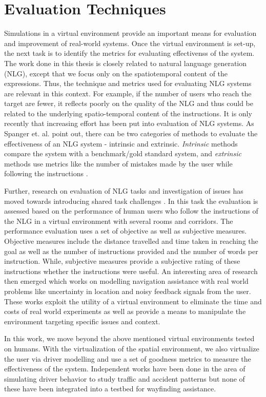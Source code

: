 \documentclass{iitkthesis}
\begin{document}
 \section{Evaluation Techniques}
Simulations in a virtual environment provide an important means for 
evaluation and improvement of real-world systems. Once the virtual 
environment is set-up, the next task is to identify the metrics for 
evaluating effectivenss of the system. The work done in this thesis is 
closely related to natural language generation (NLG), except that we focus 
only on the spatiotemporal content of the expressions. Thus, the 
technique and metrics used for evaluating NLG systems are relevant in 
this context. For example, if the number of users who reach the target 
are fewer, it reflects poorly on the quality of the NLG and thus 
could be related to the underlying spatio-temporal content of the 
instructions. It is only recently that increasing effort has 
been put into evaluation of NLG systems. As Spanger et. al. \cite{spanger} 
point out, there can be two categories of methods to evaluate the 
effectiveness of an NLG system - intrinsic and extrinsic. \textit{
Intrinsic} methods compare the system with a benchmark/gold standard 
system, and \textit{extrinsic} methods use metrics like the number of 
mistakes made by the user while following the instructions \cite{young}. 

Further, research on evaluation of NLG tasks and investigation of issues 
has moved towards introducing shared task challenges \cite{give}. In this 
task the evaluation is assessed based on the performance of human users 
who follow the instructions of the NLG in a virtual environment with 
several rooms and corridors. The performance evaluation uses a set of 
objective as well as subjective measures. Objective measures include the 
distance travelled and time taken in reaching the goal as well as the 
number of instructions provided and the number of words per instruction. 
While, subjective measures provide a subjective rating of these 
instructions whether the instructions were useful. An interesting area of 
research \cite{GRUVE} then emerged which works on modelling navigation 
assistance with real world problems like uncertainty in location and 
noisy feedback signals from the user. These works exploit the utility of a 
virtual environment to eliminate the time and costs of real world 
experiments as well as provide a means to manipulate the environment 
targeting specific issues and context.

In this work, we move beyond the above mentioned virtual environments 
tested on humans. With the virtualization of the spatial environment, we also 
virtualize the user via driver modelling and use a set of goodness 
metrics to measure the effectiveness of the system. Independent works 
have been done in the area of simulating driver behavior to study traffic 
and accident patterns but none of these have been integrated into a 
testbed for wayfinding assistance.
\end{document}
